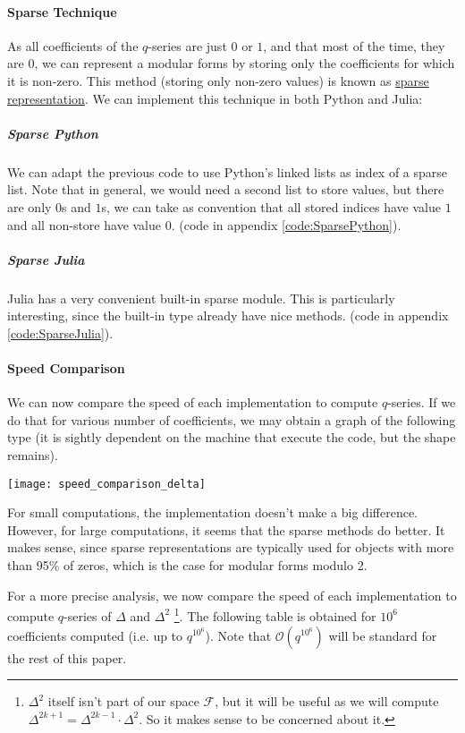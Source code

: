 \paragraph{Sparse Technique}
As all coefficients of the $q$-series are just $0$ or $1$, and that most of the time, they are $0$, we can represent a modular forms by storing only the coefficients for which it is non-zero.
This method (storing only non-zero values) is known as \href{https://en.wikipedia.org/wiki/Sparse_matrix}{sparse representation}.
We can implement this technique in both Python and Julia:
\subparagraph{Sparse Python}
We can adapt the previous code to use Python's linked lists as index of a sparse list.
Note that in general, we would need a second list to store values, but there are only $0$s and $1$s, we can take as convention that all stored indices have value $1$ and all non-store have value $0$.
(code in appendix \ref{code:SparsePython}). 
\subparagraph{Sparse Julia}
Julia has a very convenient built-in sparse module.
This is particularly interesting, since the built-in type already have nice methods.
(code in appendix \ref{code:SparseJulia}).

\paragraph{Speed Comparison}
We can now compare the speed of each implementation to compute $q$-series.
If we do that for various number of coefficients, we may obtain a graph of the following type (it is sightly dependent on the machine that execute the code, but the shape remains).

\texttt{[image: speed\_comparison\_delta]}

For small computations, the implementation doesn't make a big difference.
However, for large computations, it seems that the sparse methods do better.
It makes sense, since sparse representations are typically used for objects with more than 95\% of zeros, which is the case for modular forms modulo 2.

For a more precise analysis, we now compare the speed of each implementation to compute $q$-series of $\Delta$ and $\Delta^2$
\footnote{$\Delta^2$ itself isn't part of our space $\mathcal{F}$, but it will be useful as we will compute $\Delta^{2k+1} = \Delta^{2k-1}\cdot \Delta^2$. So it makes sense to be concerned about it.}.
The following table is obtained for $10^6$ coefficients computed (i.e. up to $q^{10^6}$).
Note that $\mathcal{O}(q^{10^6})$ will be standard for the rest of this paper.

